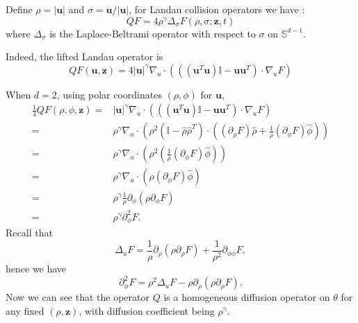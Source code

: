 \documentclass{article}
\numberwithin{equation}{section}
\begin{document}
Define $\rho = |\mathbf{u}|$ and $\sigma = \mathbf{u}/|\mathbf{u}|$, for Landau collision operators we have \cite{guillen2025landau}:
\begin{equation}\label{eq:Q_sphere_diff}
    Q F = 4\rho^{\gamma}\Delta_{\sigma} F(\rho, \sigma;\mathbf{z},t)
\end{equation}
where $\Delta_{\sigma}$ is the Laplace-Beltrami operator with respect to $\sigma$ on $\mathbb{S}^{d-1}$. 

Indeed, the lifted Landau operator is
\begin{equation*}
    Q F(\mathbf{u}, \mathbf{z}) = 4|\mathbf{u}|^{\gamma}\nabla_{u}\cdot\left(\left((\mathbf{u}^{T}\mathbf{u})\mathbb{I}-\mathbf{u}\mathbf{u}^{T}\right)\cdot\nabla_{u}F\right)
\end{equation*}

When $d=2$, using polar coordinates $(\rho, \phi)$ for $\mathbf{u}$, 
\begin{equation*}
    \begin{split}
        \frac{1}{4}QF(\rho,\phi, \mathbf{z}) =& |\mathbf{u}|^{\gamma}\nabla_{u}\cdot\left(\left((\mathbf{u}^{T}\mathbf{u})\mathbb{I}-\mathbf{u}\mathbf{u}^{T}\right)\cdot\nabla_{u}F\right)\\
        =& \rho^{\gamma}\nabla_{u}\cdot\left(\rho^{2}\left(\mathbb{I}-\hat{\rho}\hat{\rho}^{T}\right)\cdot\left((\partial_{\rho}F)\hat{\rho} + \frac{1}{\rho}(\partial_{\phi}F)\hat{\phi}\right)\right)\\
        =&\rho^{\gamma}\nabla_{u}\cdot\left(\rho^{2}\left(\frac{1}{\rho}(\partial_{\phi}F)\hat{\phi}\right)\right)\\
        =&\rho^{\gamma}\nabla_{u}\cdot\left(\rho(\partial_{\phi}F)\hat{\phi}\right)\\
        =&\rho^{\gamma}\frac{1}{\rho}\partial_{\phi}(\rho\partial_{\phi}F)\\
        =&\rho^{\gamma}\partial_{\phi}^{2}F.
    \end{split}
\end{equation*}
Recall that
\begin{equation*}
    \Delta_{u} F =  \frac{1}{\rho}\partial_{\rho}(\rho \partial_{\rho}F) + \frac{1}{\rho^{2}}\partial_{\phi\phi}F,
\end{equation*}
hence we have
\begin{equation*}
    \partial_{\phi}^{2}F = \rho^{2}\Delta_{u} F - \rho\partial_{\rho}(\rho\partial_{\rho}F).
\end{equation*}
Now we can see that the operator $Q$ is a homogeneous diffusion operator on $\theta$ for any fixed $(\rho,\mathbf{z})$, with diffusion coefficient being $\rho^{\gamma}$.
\end{document}
